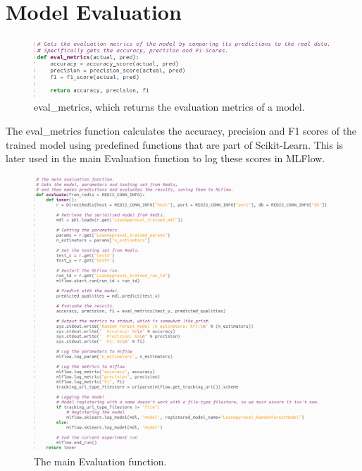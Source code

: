 \documentclass[12pt]{report}
\newcommand{\para}{\vspace{7pt}\noindent}
\begin{document}
\section{Model Evaluation}\label{sec:ImpEvaluation}

\begin{figure}[H]
    \centering
    \includegraphics[width=\linewidth]{Implementation/.Code/PipelineFunctions/Evaluation1.png}
    \caption{eval\_metrics, which returns the evaluation metrics of a model.}
    \label{fig:Evaluation1}
\end{figure}

\para The eval\_metrics function calculates the accuracy, precision and F1 scores of the trained model 
using predefined functions that are part of Scikit-Learn. This is later used in the main Evaluation function 
to log these scores in MLFlow.

\begin{figure}[H]
    \centering
    \includegraphics[width=\linewidth]{Implementation/JAN 10 UPDATES/Evaluation2.png}
    \caption{The main Evaluation function.}
    \label{fig:Evaluation2}
\end{figure}
\end{document}
